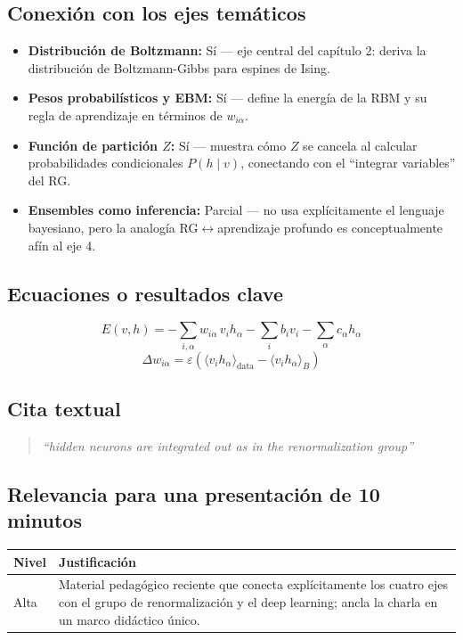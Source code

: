 \documentclass[12pt]{article}
\begin{document}
\subsection*{Conexión con los ejes temáticos}
\begin{itemize}
  \item \textbf{Distribución de Boltzmann:} Sí --- eje central del capítulo 2: deriva la distribución de Boltzmann-Gibbs para espines de Ising.
  \item \textbf{Pesos probabilísticos y EBM:} Sí --- define la energía de la RBM y su regla de aprendizaje en términos de $w_{i\alpha}$.
  \item \textbf{Función de partición $Z$:} Sí --- muestra cómo $Z$ se cancela al calcular probabilidades condicionales $P(h\mid v)$, conectando con el ``integrar variables'' del RG.
  \item \textbf{Ensembles como inferencia:} Parcial --- no usa explícitamente el lenguaje bayesiano, pero la analogía RG$\leftrightarrow$aprendizaje profundo es conceptualmente afín al eje 4.
\end{itemize}

\subsection*{Ecuaciones o resultados clave}
\begin{equation}
E(v,h) = -\sum_{i,\alpha} w_{i\alpha}\, v_i h_\alpha - \sum_i b_i v_i - \sum_\alpha c_\alpha h_\alpha
\end{equation}
\begin{equation}
\Delta w_{i\alpha} = \varepsilon\left(\langle v_i h_\alpha\rangle_{\text{data}} - \langle v_i h_\alpha\rangle_{B}\right)
\end{equation}

\subsection*{Cita textual}
\begin{quote}
\textit{``hidden neurons are integrated out as in the renormalization group''}
\end{quote}

\subsection*{Relevancia para una presentación de 10 minutos}
\begin{tabular}{@{}p{2cm}p{11.5cm}@{}}
\toprule
\textbf{Nivel} & \textbf{Justificación} \\
\midrule
Alta & Material pedagógico reciente que conecta explícitamente los cuatro ejes con el grupo de renormalización y el deep learning; ancla la charla en un marco didáctico único. \\
\bottomrule
\end{tabular}
\end{document}

